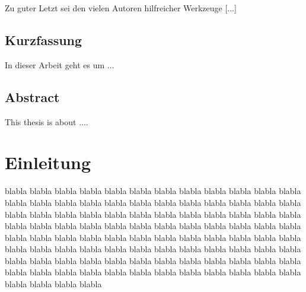 \documentclass[12pt,a4paper,DIV13,pdftex,BCOR10mm,fleqn,liststotoc,bibtotoc,cleardoubleempty]{scrbook}
\begin{document}
Zu guter Letzt sei den vielen Autoren hilfreicher Werkzeuge [...]

\cleardoublepage     %

\thispagestyle{empty}
\section*{Kurzfassung}
In dieser Arbeit geht es um ...

\vspace{5cm}
\section*{Abstract}
This thesis is about ....

\nonfrenchspacing
\renewcommand{\figurename}{Abb.}
\renewcommand{\tablename}{Tab.}


\tableofcontents %
\listoffigures %
\listoftables
\mainmatter
%
\chapter{Einleitung}
blabla blabla blabla blabla blabla blabla blabla blabla blabla blabla blabla blabla blabla blabla blabla blabla blabla blabla blabla blabla blabla blabla blabla blabla blabla blabla blabla blabla blabla blabla blabla blabla blabla blabla blabla blabla blabla blabla blabla blabla blabla blabla blabla blabla blabla blabla blabla blabla blabla blabla blabla blabla blabla blabla blabla blabla blabla blabla blabla blabla blabla blabla blabla blabla blabla blabla blabla blabla blabla blabla blabla blabla blabla blabla blabla blabla blabla blabla blabla blabla blabla blabla blabla blabla blabla blabla blabla blabla blabla blabla blabla blabla blabla blabla blabla blabla blabla blabla blabla blabla
\end{document}
